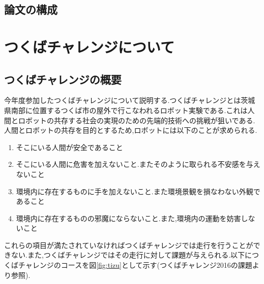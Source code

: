 \documentclass[12pt,oneside]{sotsuken_paper}
\begin{document}
\section{論文の構成}

\chapter{つくばチャレンジについて}
\section{つくばチャレンジの概要}
今年度参加したつくばチャレンジについて説明する.つくばチャレンジとは茨城県南部に位置するつくば市の屋外で行こなわれるロボット実験である.これは人間とロボットの共存する社会の実現のための先端的技術への挑戦が狙いである.人間とロボットの共存を目的とするため,ロボットには以下のことが求められる.
\begin{enumerate}
 \item そこにいる人間が安全であること
\item そこにいる人間に危害を加えないこと.またそのように取られる不安感を与えないこと
 \item 環境内に存在するものに手を加えないこと.また環境景観を損なわない外観であること
\item 環境内に存在するものの邪魔にならないこと.また,環境内の運動を妨害しないこと
\end{enumerate}
これらの項目が満たされていなければつくばチャレンジでは走行を行うことができない.また,つくばチャレンジではその走行に対して課題が与えられる.以下につくばチャレンジのコースを図\ref{fig:tizu}として示す(つくばチャレンジ2016の課題より参照).
\end{document}

